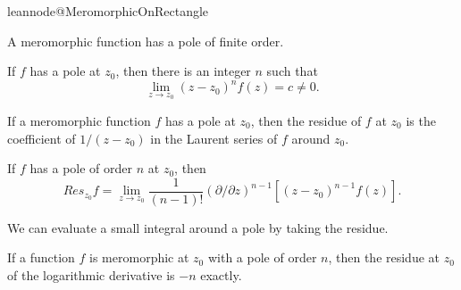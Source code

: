 

\makeatletter

\providecommand{\newleannode}[2]{%
  \expandafter\gdef\csname leannode@#1\endcsname{#2}}
\providecommand{\inputleannode}[1]{%
  \csname leannode@#1\endcsname}

\providecommand{\newleanmodule}[2]{%
  \expandafter\gdef\csname leanmodule@#1\endcsname{#2}}
\providecommand{\inputleanmodule}[1]{%
  \csname leanmodule@#1\endcsname}

\makeatother


\newleannode{MeromorphicOnRectangle}{}

\newleanmodule{PrimeNumberTheoremAnd.GeneralMeromorphic}{
\inputleannode{MeromorphicOnRectangle}

A meromorphic function has a pole of finite order.
\begin{definition}\label{PoleOrder}
If $f$ has a pole at $z_0$, then there is an integer $n$ such that
$$
\lim_{z\to z_0} (z-z_0)^n f(z) = c \neq 0.
$$
\end{definition}

If a meromorphic function $f$ has a pole at $z_0$, then the residue of
$f$ at $z_0$ is the coefficient of $1/(z-z_0)$ in the Laurent series of
$f$ around $z_0$.
\begin{definition}\label{Residue}
If $f$ has a pole of order $n$ at $z_0$, then
$$
Res_{z_0} f =
  \lim_{z\to z_0}\frac1{(n-1)!}
    (\partial/\partial z)^{n-1}[(z-z_0)^{n-1}f(z)].
$$
\end{definition}

We can evaluate a small integral around a pole by taking the residue.

If a function $f$ is meromorphic at $z_0$ with a pole of order $n$, then
the residue at $z_0$ of the logarithmic derivative is $-n$ exactly.
}
